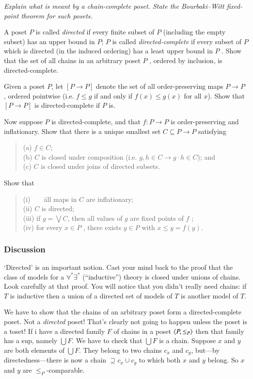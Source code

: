 \documentclass{book}
\begin{document}
{\sl Explain what is meant by a {\sl chain-complete} poset. State the
Bourbaki--Witt fixed-point theorem for such posets.

A poset $P$ is called {\sl directed} if every finite subset of $P$
(including the empty subset) has an upper bound in $P$; $P$ is called
{\sl directed-complete} if every subset of $P$ which is directed (in the
induced ordering) has a least upper bound in $P$ . Show that the set
of all chains in an arbitrary poset $P$ , ordered by inclusion, is
directed-complete.

Given a poset $P$, let $[P \to P]$ denote the set of all
order-preserving maps $P \to P$ , ordered pointwise (i.e. $f \leq g$
if and only if $f (x) \leq g(x)$ for all $x$). Show that $[P \to P]$ is
directed-complete if $P$ is.

Now suppose $P$ is directed-complete, and that $f : P \to P$ is
order-preserving and inflationary. Show that there is a unique
smallest set $C \subseteq P \to P$ satisfying
\begin{quote}
(a) $f \in C$;\\
(b) $C$ is closed under composition (i.e. $g, h \in C \to g \cdot h \in C$); and\\
(c) $C$ is closed under joins of directed subsets.\end{quote}

Show that
\begin{quote}
\begin{tabbing}
(i)\ \ \ \ \= all maps in $C$ are inflationary;\\
(ii) \> $C$ is directed;\\
(iii) \> if $g = \bigvee C$, then all values of $g$ are fixed points of $f$ ;\\
(iv) \>for every $x \in  P$ , there exists $y \in P$ with $x\leq y = f(y)$.\end{tabbing}\end{quote}
}
\subsubsection*{Discussion}

`Directed' is an important notion.  Cast your mind back to the proof
that the class of models for a $\forall^*\exists^*$ (``inductive'')
theory is closed under unions of chains.  Look carefully at that proof.
You will notice that you didn't really need chains: if $T$ is
inductive then a union of a directed set of models of $T$ is another
model of $T$.

We have to show that the chains of an arbitrary poset form a
directed-complete poset.  Not a {\sl directed} poset!  That's clearly
not going to happen unless the poset is a toset!  If i have a directed
family $F$ of chains in a poset $\mbox{$\langle P, \leq_P \rangle$}$ then that family
has a sup, namely $\bigcup F$.  We have to check that $\bigcup F$ is a
chain.  Suppose $x$ and $y$ are both elements of $\bigcup F$.  They
belong to two chains $c_x$ and $c_y$, but---by directedness---there is
now a chain $\supseteq c_x \cup c_y$ to which both $x$ and $y$ belong.
So $x$ and $y$ are $\leq_P$-comparable.
\end{document}
